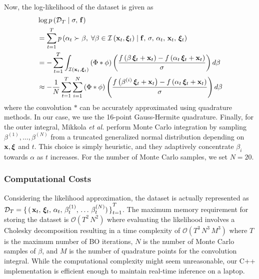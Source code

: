 Now, the log-likelihood of the dataset is given as
{\small
\begin{align}
  &\log p\left(\mathcal{D}_T \mid \sigma,\, \mathbf{f} \right) \\
  &= \sum_{t=1}^{T} p\left(\alpha_t \succ \beta,\; \forall \beta \in \mathcal{I}\left(\mathbf{x}_t, \bm{\xi}_t\right) \mid \mathbf{f},\, \sigma,\, \alpha_t,\, \mathbf{x}_t,\, \bm{\xi}_t\right) \\
  &= -\sum_{t=1}^{T} \int_{\mathcal{I}\left(\mathbf{x}_{t}, \bm{\xi}_{t}\right)} \left(\Phi * \phi \right) \left( \frac{ f\left(\beta \, \bm{\xi}_{t} + \mathbf{x}_{t} \right) - f\left(\alpha_{t} \, \bm{\xi}_{t} + \mathbf{x}_{t} \right) }{\sigma} \right) d\beta \\
  &\approx -\frac{1}{N}  \sum_{t=1}^{T} \sum_{i=1}^N \left(\Phi * \phi \right) \left( \frac{ f\left(\beta^{(i)} \, \bm{\xi}_{t} + \mathbf{x}_{t} \right) - f\left(\alpha_{t} \, \bm{\xi}_{t} + \mathbf{x}_{t} \right) }{\sigma} \right) d\beta
\end{align}
}%
{\noindent}where the convolution \(*\) can be accurately approximated using quadrature methods.
In our case, we use the 16-point Gauss-Hermite quadrature.
Finally, for the outer integral, Mikkola \textit{et al.} perform Monte Carlo integration by sampling \(\beta^{(1)}, \ldots, \beta^{(N)} \) from a truncated generalized normal distribution depending on \(\mathbf{x}, \bm{\xi}\) and \(t\).
This choice is simply heuristic, and they adaptively concentrate \(\beta_i\) towards \(\alpha\) as \(t\) increases.
For the number of Monte Carlo samples, we set \(N=20\).

\subsubsection{Computational Costs}
Considering the likelihood approximation, the dataset is actually represented as \(\mathcal{D}_{T} = {\{\,(\,\mathbf{x}_{t},\, \bm{\xi}_{t},\, \alpha_{t},\, \beta^{(1)}_{t},\, \ldots\, \beta^{(N)}_{t})\,\}}_{t=1}^{T}\).
The maximum memory requirement for storing the dataset is \(\mathcal{O}\left( T^2 \, N^2  \right)\) where evaluating the likelihood involves a Cholesky decomposition resulting in a time complexity of \(\mathcal{O}\left( T^3 \, N^3 \, M^3  \right)\) where \(T\) is the maximum number of BO iterations, \(N\) is the number of Monte Carlo samples of \(\beta\), and \(M\) is the number of quadrature points for the convolution integral.
While the computational complexity might seem unreasonable, our C++ implementation is efficient enough to maintain real-time inference on a laptop.

